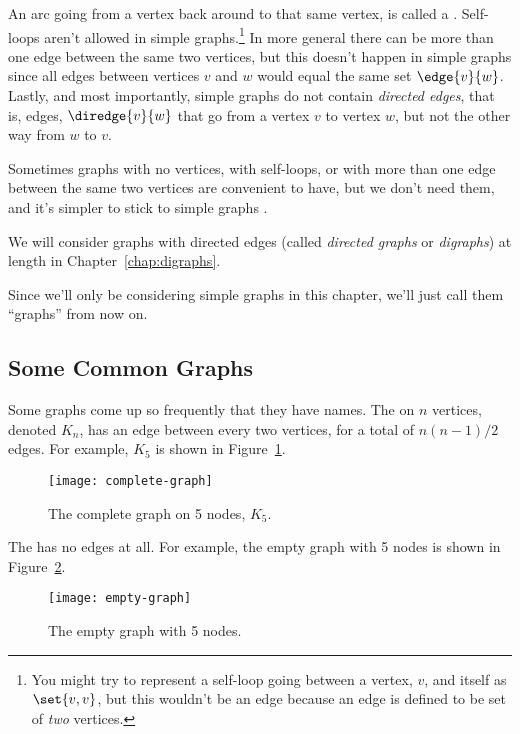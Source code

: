 An arc going from a vertex back around to that same vertex, is called a
.  Self-loops aren't allowed in simple
graphs.\footnote{You might try to represent a self-loop going between a
  vertex, $v$, and itself as $\set{v, v}$, but this wouldn't be an edge
  because an edge is defined to be set of \emph{two} vertices.}  In more
general  there can be more than one edge between the
same two vertices, but this doesn't happen in simple graphs since all
edges between vertices $v$ and $w$ would equal the same set $\edge{v}{w}$.
Lastly, and most importantly, simple graphs do not contain \emph{directed
  edges}, that is, edges, $\diredge{v}{w}$ that go from a vertex $v$ to
vertex $w$, but not the other way from $w$ to $v$.

Sometimes graphs with no vertices, with self-loops, or with more than one
edge between the same two vertices are convenient to have, but we don't
need them, and it's simpler to stick to simple graphs \smiley.
\begin{editingnotes}
We will consider graphs with directed edges (called \emph{directed graphs} or
\emph{digraphs}) at length in Chapter~\ref{chap:digraphs}.
\end{editingnotes}
Since we'll only be considering simple graphs in this chapter, we'll just
call them ``graphs'' from now on.

\subsection{Some Common Graphs}

Some graphs come up so frequently that they have names.  The
 on $n$ vertices, denoted $K_n$, has an edge
between every two vertices, for a total of $n(n-1)/2$ edges.  For
example, $K_5$ is shown in Figure~\ref{fig:K_5}.

\begin{figure}\redrawn

\texttt{[image: complete-graph]}

\caption{The complete graph on 5 nodes, $K_5$.}
\label{fig:K_5}
\end{figure}

The  has no edges at all.  For example, the empty
graph with 5 nodes is shown in Figure~\ref{fig:graph_empty_5}.

\begin{figure}\redrawn

\texttt{[image: empty-graph]}

\caption{The empty graph with 5 nodes.}
\label{fig:graph_empty_5}
\end{figure}

